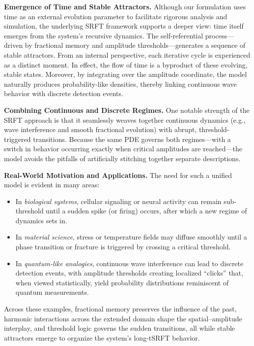 \documentclass[12pt]{article}
\begin{document}
\medskip

\noindent
\textbf{Emergence of Time and Stable Attractors.}  
Although our formulation uses time as an external evolution parameter to facilitate rigorous analysis and simulation, the underlying SRFT framework supports a deeper view: time itself emerges from the system’s recursive dynamics. The self-referential process—driven by fractional memory and amplitude thresholds—generates a sequence of stable attractors. From an internal perspective, each iterative cycle is experienced as a distinct moment. In effect, the flow of time is a byproduct of these evolving, stable states. Moreover, by integrating over the amplitude coordinate, the model naturally produces probability-like densities, thereby linking continuous wave behavior with discrete detection events.

\medskip

\noindent
\textbf{Combining Continuous and Discrete Regimes.}  
One notable strength of the SRFT approach is that it seamlessly weaves together continuous dynamics (e.g., wave interference and smooth fractional evolution) with abrupt, threshold-triggered transitions. Because the same PDE governs both regimes—with a switch in behavior occurring exactly when critical amplitudes are reached—the model avoids the pitfalls of artificially stitching together separate descriptions.

\medskip

\noindent
\textbf{Real-World Motivation and Applications.}  
The need for such a unified model is evident in many areas:
\begin{itemize}
    \item In \emph{biological systems}, cellular signaling or neural activity can remain sub-threshold until a sudden spike (or firing) occurs, after which a new regime of dynamics sets in.
    \item In \emph{material science}, stress or temperature fields may diffuse smoothly until a phase transition or fracture is triggered by crossing a critical threshold.
    \item In \emph{quantum-like analogies}, continuous wave interference can lead to discrete detection events, with amplitude thresholds creating localized “clicks” that, when viewed statistically, yield probability distributions reminiscent of quantum measurements.
\end{itemize}
Across these examples, fractional memory preserves the influence of the past, harmonic interactions across the extended domain shape the spatial–amplitude interplay, and threshold logic governs the sudden transitions, all while stable attractors emerge to organize the system’s long-tSRFT behavior.
\end{document}

